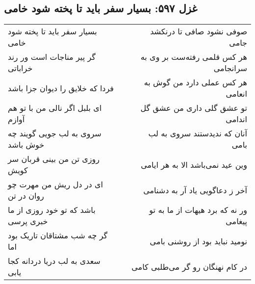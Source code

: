 \begin{center}
\section*{غزل ۵۹۷: بسیار سفر باید تا پخته شود خامی}
\label{sec:597}
\begin{longtable}{l p{0.5cm} r}
بسیار سفر باید تا پخته شود خامی
&&
صوفی نشود صافی تا درنکشد جامی
\\
گر پیر مناجات است ور رند خراباتی
&&
هر کس قلمی رفته‌ست بر وی به سرانجامی
\\
فردا که خلایق را دیوان جزا باشد
&&
هر کس عملی دارد من گوش به انعامی
\\
ای بلبل اگر نالی من با تو هم آوازم
&&
تو عشق گلی داری من عشق گل اندامی
\\
سروی به لب جویی گویند چه خوش باشد
&&
آنان که ندیدستند سروی به لب بامی
\\
روزی تن من بینی قربان سر کویش
&&
وین عید نمی‌باشد الا به هر ایامی
\\
ای در دل ریش من مهرت چو روان در تن
&&
آخر ز دعاگویی یاد آر به دشنامی
\\
باشد که تو خود روزی از ما خبری پرسی
&&
ور نه که برد هیهات از ما به تو پیغامی
\\
گر چه شب مشتاقان تاریک بود اما
&&
نومید نباید بود از روشنی بامی
\\
سعدی به لب دریا دردانه کجا یابی
&&
در کام نهنگان رو گر می‌طلبی کامی
\\
\end{longtable}
\end{center}
